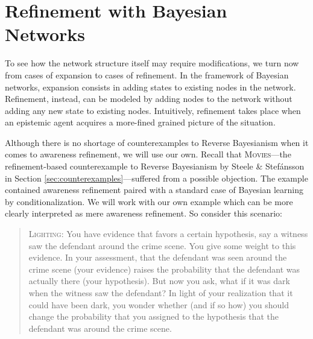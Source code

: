 \documentclass[
  11pt,
  dvipsnames,enabledeprecatedfontcommands, todos]{scrartcl}
\begin{document}
\hypertarget{refinement-with-bayesian-networks}{%
\section{Refinement with Bayesian
Networks}\label{refinement-with-bayesian-networks}}

\label{sec:structural-both}

To see how the network structure itself may require modifications, we
turn now from cases of expansion to cases of refinement. In the
framework of Bayesian networks, expansion consists in adding states to
existing nodes in the network. Refinement, instead, can be modeled by
adding nodes to the network without adding any new state to existing
nodes. Intuitively, refinement takes place when an epistemic agent
acquires a more-fined grained picture of the situation.

Although there is no shortage of counterexamples to Reverse Bayesianism
when it comes to awareness refinement, we will use our own. Recall that
\textsc{Movies}---the refinement-based counterexample to Reverse
Bayesianism by Steele \& Stefánsson in Section
\ref{sec:counterexamples}---suffered from a possible objection. The
example contained awareness refinement paired with a standard case of
Bayesian learning by conditionalization. We will work with our own
example which can be more clearly interpreted as mere awareness
refinement. So consider this scenario:

\begin{quote}
\textsc{Lighting:} You have evidence that favors a certain hypothesis, say a witness 
saw the defendant around the crime scene. You give some weight to this evidence. 
In your assessment, that the defendant was seen around the crime scene (your evidence) raises the probability that the defendant was actually there (your hypothesis). But now you ask, what if it was dark when the witness saw the defendant? In light of your realization that it could have been dark, you wonder whether (and if so how) you should change the probability that you assigned to the hypothesis that the defendant was around the crime scene.
\end{quote}
\end{document}
